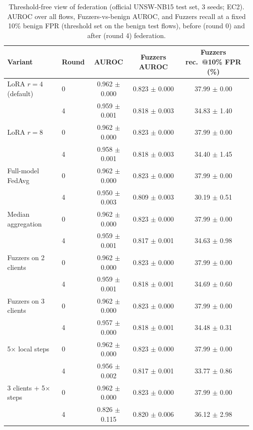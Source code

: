 \begin{table}[t]\centering
\caption{Threshold-free view of federation (official UNSW-NB15 test set, 3 seeds; EC2). AUROC over all flows, Fuzzers-vs-benign AUROC, and Fuzzers recall at a fixed 10\% benign FPR (threshold set on the benign test flows), before (round 0) and after (round 4) federation.}
\label{tab:operating}
\begin{tabular}{llccc}\toprule
Variant & Round & AUROC & Fuzzers AUROC & Fuzzers rec.\ @10\% FPR (\%) \\ \midrule
LoRA $r{=}4$ (default) & 0 & 0.962 $\pm$ 0.000 & 0.823 $\pm$ 0.000 & 37.99 $\pm$ 0.00 \\
 & 4 & 0.959 $\pm$ 0.001 & 0.818 $\pm$ 0.003 & 34.83 $\pm$ 1.40 \\
LoRA $r{=}8$ & 0 & 0.962 $\pm$ 0.000 & 0.823 $\pm$ 0.000 & 37.99 $\pm$ 0.00 \\
 & 4 & 0.958 $\pm$ 0.001 & 0.818 $\pm$ 0.003 & 34.40 $\pm$ 1.45 \\
Full-model FedAvg & 0 & 0.962 $\pm$ 0.000 & 0.823 $\pm$ 0.000 & 37.99 $\pm$ 0.00 \\
 & 4 & 0.950 $\pm$ 0.003 & 0.809 $\pm$ 0.003 & 30.19 $\pm$ 0.51 \\
Median aggregation & 0 & 0.962 $\pm$ 0.000 & 0.823 $\pm$ 0.000 & 37.99 $\pm$ 0.00 \\
 & 4 & 0.959 $\pm$ 0.001 & 0.817 $\pm$ 0.001 & 34.63 $\pm$ 0.98 \\
Fuzzers on 2 clients & 0 & 0.962 $\pm$ 0.000 & 0.823 $\pm$ 0.000 & 37.99 $\pm$ 0.00 \\
 & 4 & 0.959 $\pm$ 0.001 & 0.818 $\pm$ 0.001 & 34.69 $\pm$ 0.60 \\
Fuzzers on 3 clients & 0 & 0.962 $\pm$ 0.000 & 0.823 $\pm$ 0.000 & 37.99 $\pm$ 0.00 \\
 & 4 & 0.957 $\pm$ 0.000 & 0.818 $\pm$ 0.001 & 34.48 $\pm$ 0.31 \\
5$\times$ local steps & 0 & 0.962 $\pm$ 0.000 & 0.823 $\pm$ 0.000 & 37.99 $\pm$ 0.00 \\
 & 4 & 0.956 $\pm$ 0.002 & 0.817 $\pm$ 0.001 & 33.77 $\pm$ 0.86 \\
3 clients + 5$\times$ steps & 0 & 0.962 $\pm$ 0.000 & 0.823 $\pm$ 0.000 & 37.99 $\pm$ 0.00 \\
 & 4 & 0.826 $\pm$ 0.115 & 0.820 $\pm$ 0.006 & 36.12 $\pm$ 2.98 \\
\bottomrule\end{tabular}\end{table}

